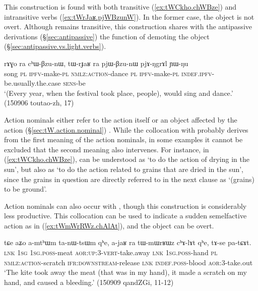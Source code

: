 This construction is found with both transitive (\ref{ex:tWCkho.chWBze}) and intransitive verbs (\ref{ex:tWrJaʁ.pjWBzunW}). In the former case, the object is not overt. Although  remains transitive, this construction shares with the antipassive derivations (§\ref{sec:antipassive}) the function of demoting the object (§\ref{sec:antipassive.vs.light.verbs}).

\begin{exe}
	\ex \label{ex:tWrJaʁ.pjWBzunW}
	\gll rɤɣo ra cʰɯ-βzu-nɯ, tɯ-rɟaʁ ra pjɯ-βzu-nɯ pjɤ-ŋgrɤl ɲɯ-ŋu \\
	song \textsc{pl} \textsc{ipfv}-make-\textsc{pl} \textsc{nmlz}:\textsc{action}-dance \textsc{pl} \textsc{ipfv}-make-\textsc{pl} \textsc{indef}.\textsc{ipfv}-be.usually.the.case \textsc{sens}-be \\
	\glt `(Every year, when the festival took place, people), would sing and dance.' (150906 toutao-zh, 17)
\end{exe}

Action nominals either refer to the action itself or an object affected by the action (§\ref{sec:tW.action.nominal}) . While the collocation with  probably derives from the first meaning of the action nominals, in some examples it cannot be excluded that the second meaning also intervenes. For instance, in (\ref{ex:tWCkho.chWBze}),  can be understood as `to do the action of drying in the sun', but also as `to do the action related to grains that are dried in the sun', since the grains in question are directly referred to in the next clause as  `(grains) to be ground'.

Action nominals can also occur with , though this construction is considerably less productive. This collocation can be used to indicate a sudden semelfactive action as in (\ref{ex:tWmWrRWz.chAlAt}), and the object can be overt.

\begin{exe}
	\ex \label{ex:tWmWrRWz.chAlAt}
	\gll    tɕe aʑo a-mtʰɯm ta-nɯ-tsɯm qʰe, a-jaʁ ra tɯ-mɯrʁɯz cʰɤ-lɤt qʰe, tɤ-se pa-tɕɤt.  \\
	\textsc{lnk} \textsc{1sg} \textsc{1sg}.\textsc{poss}-meat \textsc{aor}:\textsc{up}:3\flobv{}-\textsc{vert}-take.away  \textsc{lnk} \textsc{1sg}.\textsc{poss}-hand \textsc{pl} \textsc{nmlz}:\textsc{action}-scratch \textsc{ifr}:\textsc{downstream}-release \textsc{lnk} \textsc{indef}.\textsc{poss}-blood \textsc{aor}:3\flobv{}-take.out \\
	\glt  `The kite took away the meat (that was in my hand), it made a scratch on my hand, and caused a bleeding.' (150909 qandZGi, 11-12)
\end{exe}

